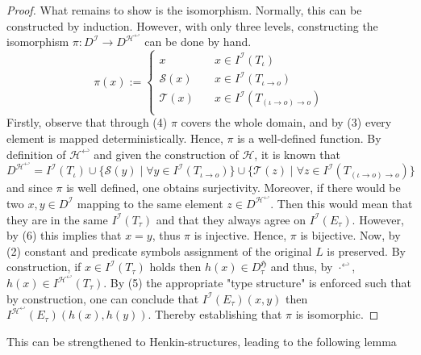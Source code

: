 \documentclass[11pt,a4paper]{article}
\newcommand{\tofo}{\hookleftarrow}
\newcommand{\of}{\iota }
\newcommand{\os}{\iota \to o}
\newcommand{\ot}{(\iota \to o)\to o}
\begin{document}
\begin{proof}
What remains to show is the isomorphism. Normally, this can be constructed by induction. However, with only three levels, constructing the isomorphism $\pi: D^{\mathcal{I}} \to D^{\mathcal{H}^{\tofo}} $ can be done by hand.
\begin{equation*}
\pi(x) :=
 \begin{cases}
 x & \quad x \in I^{\mathcal{I}}(T_{\of}) \\
\mathcal{S}(x) & \quad x \in I^{\mathcal{I}}(T_{\os}) \\
\mathcal{T}(x)    & \quad x \in I^{\mathcal{I}}(T_{\ot}) \\
 \end{cases}
\end{equation*}
Firstly, observe that through (4) $\pi$ covers the whole domain, and by (3) every element is mapped deterministically. Hence, $\pi$ is a well-defined function. By definition of $\mathcal{H}^{\tofo}$ and given the construction of $\mathcal{H}$, it is known that 
\begin{equation*}
D^{\mathcal{H}^{\tofo}}=I^{\mathcal{I}}(T_{\of}) \cup \{ \mathcal{S}(y) \mid \forall  y \in I^{\mathcal{I}}(T_{\os})\} \cup \{\mathcal{T}(z) \mid \forall  z \in I^{\mathcal{I}}(T_{\ot})\}
\end{equation*}
and since $\pi$ is well defined, one obtains surjectivity. Moreover, if there would be two $x,y \in D^{\mathcal{I}}$ mapping to the same element $z \in D^{\mathcal{H}^{\tofo}}$. Then this would mean that they are in the same $I^{\mathcal{I}}(T_{\tau})$ and that they always agree on $I^{\mathcal{I}}(E_{\tau})$. However, by (6) this implies that $x=y$, thus $\pi$ is injective. Hence, $\pi$ is bijective. Now, by (2) constant and predicate symbols assignment of the original $L$ is preserved. By construction, if $x\in I^{\mathcal{I}}(T_{\tau})$ holds then $h(x) \in  D_{\tau}^{\mathfrak{H}}$ and thus, by $\cdot^{\tofo}$, $h(x) \in I^{\mathcal{H}^{\tofo}}(T_{\tau})$. By (5) the appropriate "type structure" is enforced such that by construction, one can conclude that $I^{\mathcal{I}}(E_{\tau})(x,y)$ then $I^{\mathcal{H}^{\tofo}}(E_{\tau})(h(x),h(y))$. Thereby establishing that $\pi$ is isomorphic.
\end{proof}

This can be strengthened to Henkin-structures, leading to the following lemma
\end{document}
